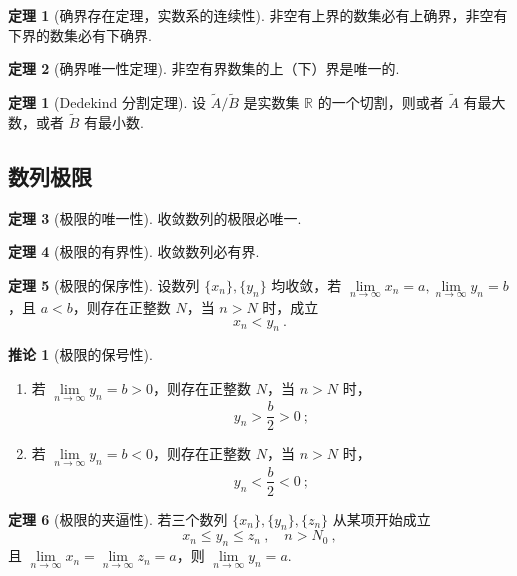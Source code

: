 \documentclass[zihao=-4,linespread=1.8,UTF8,nothm]{aytony_base}
\theoremstyle{definition}
\newtheorem*{theorem*}{\indent\heiti\textbf{定理}}
\newtheorem{theorem}{\indent\heiti\textbf{定理}}[subsection]
\newtheorem*{corollary}{\indent\heiti\textbf{推论}}
\begin{document}
\begin{theorem}[确界存在定理，实数系的连续性]
    非空有上界的数集必有上确界，非空有下界的数集必有下确界.
\end{theorem}

\begin{theorem}[确界唯一性定理]
    非空有界数集的上（下）界是唯一的.
\end{theorem}

\begin{theorem*}[Dedekind 分割定理]
    设 $\tilde{A} / \tilde{B}$ 是实数集 $\mathbb{R}$ 的一个切割，则或者 $\tilde{A}$ 有最大数，或者 $\tilde{B}$ 有最小数.
\end{theorem*}

\subsection{数列极限}

\begin{theorem}[极限的唯一性]
    收敛数列的极限必唯一.
\end{theorem}

\begin{theorem}[极限的有界性]
    收敛数列必有界.
\end{theorem}

\begin{theorem}[极限的保序性]
    设数列 $\{x_n\}, \{y_n\}$ 均收敛，若 $\lim\limits_{n \to \infty} x_n = a, \lim\limits_{n \to \infty} y_n = b$，且 $a < b$，则存在正整数 $N$，当 $n > N$ 时，成立 $$
        x_n<y_n\ .
    $$
\end{theorem}

\begin{corollary}[极限的保号性]
    \begin{enumerate}
        \item 若 $\lim\limits_{n \to \infty} y_n = b > 0$，则存在正整数 $N$，当 $n > N$ 时，$$
                  y_n > \dfrac{b}{2} > 0\ ;
              $$
        \item 若 $\lim\limits_{n \to \infty} y_n = b < 0$，则存在正整数 $N$，当 $n > N$ 时，$$
                  y_n < \dfrac{b}{2} < 0\ ;
              $$
    \end{enumerate}
\end{corollary}

\begin{theorem}[极限的夹逼性]
    若三个数列 $\{x_n\}, \{y_n\}, \{z_n\}$ 从某项开始成立 $$
        x_n \leqslant y_n \leqslant z_n\ ,\quad n > N_0\ ,
    $$ 且 $\lim\limits_{n \to \infty} x_n = \lim\limits_{n \to \infty} z_n = a$，则 $\lim\limits_{n \to \infty} y_n = a$.
\end{theorem}
\end{document}
